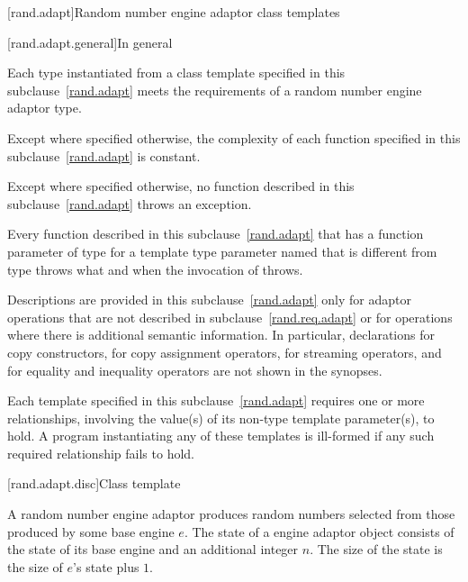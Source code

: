 

[rand.adapt]{Random number engine adaptor class templates}

[rand.adapt.general]{In general}

\pnum
Each type instantiated
from a class template specified in this subclause~\ref{rand.adapt}
meets the requirements
of a random number engine adaptor type.

\pnum
Except where specified otherwise,
the complexity of each function
specified in this subclause~\ref{rand.adapt}
is constant.

\pnum
Except where specified otherwise,
no function described in this subclause~\ref{rand.adapt}
throws an exception.

\pnum
Every function described in this subclause~\ref{rand.adapt}
that has a function parameter  of type 
for a template type parameter named 
that is different from type 
throws what and when the invocation of  throws.

\pnum
Descriptions are provided in this subclause~\ref{rand.adapt}
only for adaptor operations
that are not described in subclause~\ref{rand.req.adapt}
or for operations where there is additional semantic information.
In particular,
declarations for copy constructors,
for copy assignment operators,
for streaming operators,
and for equality and inequality operators
are not shown in the synopses.

\pnum
Each template specified in this subclause~\ref{rand.adapt}
requires one or more relationships,
involving the value(s) of its non-type template parameter(s), to hold.
A program instantiating any of these templates
is ill-formed
if any such required relationship fails to hold.


[rand.adapt.disc]{Class template }%
%

\pnum
A  random number engine adaptor
produces random numbers
selected from those produced by some base engine $e$.
The state%
%
of a  engine adaptor object 
consists of the state  of its base engine 
and an additional integer $n$.
The size of the state is
 the size of $e$'s state plus $1$.

